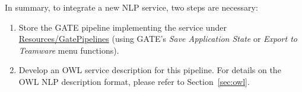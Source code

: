 In summary, to integrate a new NLP service, two steps are necessary:
\begin{enumerate}
\item Store the GATE pipeline implementing the service under
  \url{Resources/GatePipelines} (using GATE's \emph{Save Application State}
  or \emph{Export to Teamware} menu functions).
\item Develop an OWL service description for this pipeline.  For
  details on the OWL NLP description format, please refer to
  Section~\ref{sec:owl}.
\end{enumerate}
